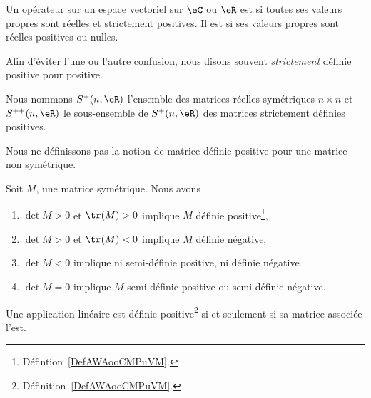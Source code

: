 \begin{definition}    \label{DefAWAooCMPuVM}
    Un opérateur sur un espace vectoriel sur \( \eC\) ou \( \eR\) est  si toutes ses valeurs propres sont réelles et strictement positives.  Il est  si ses valeurs propres sont réelles positives ou nulles.
\end{definition}
Afin d'éviter l'une ou l'autre confusion, nous disons souvent \emph{strictement} définie positive pour positive.

\begin{normaltext}      \label{NORMooAJLHooQhwpvr}
    Nous nommons \( S^+(n,\eR)\) l'ensemble des matrices réelles symétriques \( n\times n\) et \( S^{++}(n,\eR)\) le sous-ensemble de \( S^+(n,\eR)\) des matrices strictement définies positives.
\end{normaltext}

\begin{remark}
    Nous ne définissons pas la notion de matrice définie positive pour une matrice non symétrique.
\end{remark}

\begin{proposition}     \label{PropcnJyXZ}
    Soit $M$, une matrice symétrique. Nous avons
    \begin{enumerate}
        \item
            $\det M>0$ et $\tr(M)>0$ implique $M$ définie positive\footnote{Défintion~\ref{DefAWAooCMPuVM}.},
        \item
        $\det M>0$ et $\tr(M)<0$ implique $M$ définie négative,
    \item   \label{ItemluuFPN}
        $\det M<0$ implique ni semi-définie positive, ni définie négative
        \item
        $\det M=0$ implique $M$ semi-définie positive ou semi-définie négative.
    \end{enumerate}
\end{proposition}

\begin{proposition}     \label{PROPooUAAFooEGVDRC}
    Une application linéaire est définie positive\footnote{Définition~\ref{DefAWAooCMPuVM}.} si et seulement si sa matrice associée l'est.
\end{proposition}

